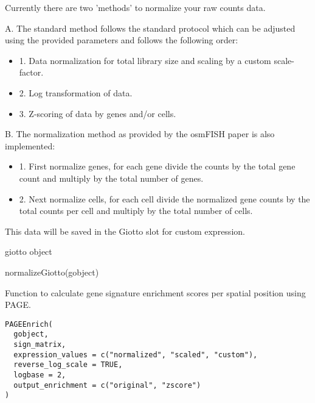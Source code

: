 \documentclass[a4paper]{book}
\begin{document}
\begin{Details}\relax
Currently there are two 'methods' to normalize your raw counts data.

A. The standard method follows the standard protocol which can be adjusted using
the provided parameters and follows the following order: \\{}
\begin{itemize}

\item{} 1. Data normalization for total library size and scaling by a custom scale-factor.
\item{} 2. Log transformation of data.
\item{} 3. Z-scoring of data by genes and/or cells.

\end{itemize}

B. The normalization method as provided by the osmFISH paper is also implemented: \\{}
\begin{itemize}

\item{} 1. First normalize genes, for each gene divide the counts by the total gene count and
multiply by the total number of genes.
\item{} 2. Next normalize cells, for each cell divide the normalized gene counts by the total
counts per cell and multiply by the total number of cells.

\end{itemize}

This data will be saved in the Giotto slot for custom expression.
\end{Details}
%
\begin{Value}
giotto object
\end{Value}
%
\begin{Examples}
\begin{ExampleCode}
    normalizeGiotto(gobject)
\end{ExampleCode}
\end{Examples}
%
\begin{Description}\relax
Function to calculate gene signature enrichment scores per spatial position using PAGE.
\end{Description}
%
\begin{Usage}
\begin{verbatim}
PAGEEnrich(
  gobject,
  sign_matrix,
  expression_values = c("normalized", "scaled", "custom"),
  reverse_log_scale = TRUE,
  logbase = 2,
  output_enrichment = c("original", "zscore")
)
\end{verbatim}
\end{Usage}
\end{document}

